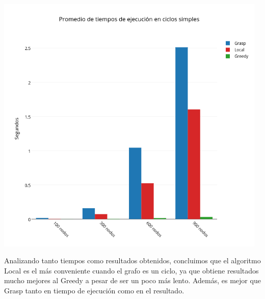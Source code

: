\begin{center}
 	\includegraphics[width=13cm, keepaspectratio=yes]{imagenes/coliseo/Cicle.png}
\end{center}

Analizando tanto tiempos como resultados obtenidos, concluimos que el algoritmo Local es el m\'as conveniente cuando el grafo es un ciclo, ya que obtiene resultados mucho mejores al Greedy a pesar
de ser un poco m\'as lento. Adem\'as, es mejor que Grasp tanto en tiempo de ejecuci\'on como en el resultado.
